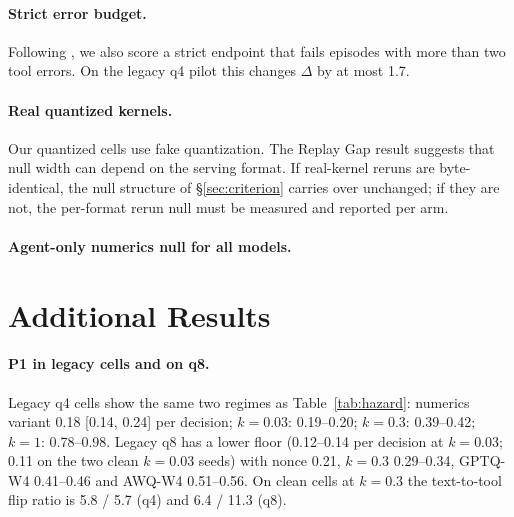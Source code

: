 \paragraph{Strict error budget.} Following \citet{jang2026flat}, we also score a strict endpoint that fails episodes with more than two tool errors. On the legacy q4 pilot this changes $\Delta$ by at most 1.7\pp{}. 

\paragraph{Real quantized kernels.} Our quantized cells use fake quantization. The Replay Gap result \citep{gonuguntla2026replay} suggests that null width can depend on the serving format.  If real-kernel reruns are byte-identical, the null structure of \S\ref{sec:criterion} carries over unchanged; if they are not, the per-format rerun null must be measured and reported per arm.

\paragraph{Agent-only numerics null for all models.} 

\section{Additional Results}
\label{app:extra}

\paragraph{P1 in legacy cells and on q8.} Legacy q4 cells show the same two regimes as Table~\ref{tab:hazard}: numerics variant 0.18 [0.14, 0.24] per decision; $k{=}0.03$: 0.19--0.20; $k{=}0.3$: 0.39--0.42; $k{=}1$: 0.78--0.98. Legacy q8 has a lower floor (0.12--0.14 per decision at $k{=}0.03$; 0.11 on the two clean $k{=}0.03$ seeds) with nonce 0.21, $k{=}0.3$ 0.29--0.34, GPTQ-W4 0.41--0.46 and AWQ-W4 0.51--0.56. On clean cells at $k{=}0.3$ the text-to-tool flip ratio is 5.8 / 5.7 (q4) and 6.4 / 11.3 (q8).

